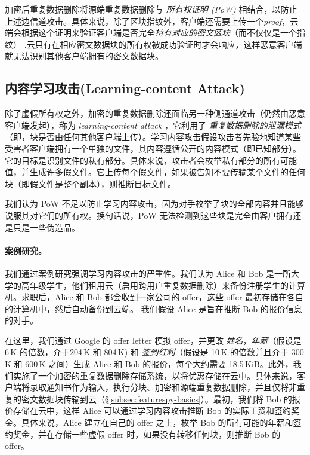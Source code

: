 加密后重复数据删除将源端重复数据删除与 {\em 所有权证明 (PoW)} \cite{halevi11} 相结合，以防止上述边信道攻击。具体来说，除了区块指纹外，客户端还需要上传一个{\em proof}，云端会根据这个证明来验证客户端是否完全{\em 持有对应的密文区块}（而不仅仅是一个指纹） .云只有在相应密文数据块的所有权被成功验证时才会响应，这样恶意客户端就无法识别其他客户端拥有的密文数据块。

\subsection{内容学习攻击(Learning-content Attack)}
\label{subsec:featurespy-attack}
除了虚假所有权之外，加密的重复数据删除还面临另一种侧通道攻击（仍然由恶意客户端发起），称为 {\em learning-content attack} \cite{harnik10, zuo2018mitigating}，它利用了 {\em 重复数据删除的泄漏模式}（即，块是否由任何其他客户端上传）。学习内容攻击假设攻击者先验地知道某些受害者客户端拥有一个单独的文件，其内容遵循公开的内容模式（即已知部分）。它的目标是识别文件的私有部分。具体来说，攻击者会枚举私有部分的所有可能值，并生成许多假文件。它上传每个假文件，如果被告知不要传输某个文件的任何块（即假文件是整个副本），则推断目标文件。

我们认为 PoW \cite{halevi11} 不足以防止学习内容攻击，因为对手枚举了块的全部内容并且能够说服其对它们的所有权。换句话说，PoW 无法检测到这些块是完全由客户拥有还是只是一些伪造品。

\paragraph*{案例研究。}
我们通过案例研究强调学习内容攻击的严重性。我们认为 Alice 和 Bob 是一所大学的高年级学生，他们租用云（启用跨用户重复数据删除）来备份注册学生的计算机。求职后，Alice 和 Bob 都会收到一家公司的 offer，这些 offer 最初存储在各自的计算机中，然后自动备份到云端。
我们假设 Alice 是旨在推断 Bob 的报价信息的对手。


在这里，我们通过 Google 的 offer letter \cite{GoogleOffer} 模拟 offer，并更改 \textit{姓名}，\textit{年薪}（假设是 6\,K \cite{harnik10} 的倍数，介于204\,K 和 804\,K) 和 \textit{签到红利}（假设是 10\,K 的倍数并且介于 300\,K 和 600\,K 之间）生成 Alice 和 Bob 的报价，每个大约需要 18.5\,KiB。此外，我们实施了一个加密的重复数据删除存储系统，以将优惠存储在云中。具体来说，客户端将录取通知书作为输入，执行分块、加密和源端重复数据删除，并且仅将非重复的密文数据块传输到云（\S\ref{subsec:featurespy-basics}）。最初，我们将 Bob 的报价存储在云中，这样 Alice 可以通过学习内容攻击推断 Bob 的实际工资和签约奖金。具体来说，Alice 建立在自己的 offer 之上，枚举 Bob 的所有可能的年薪和签约奖金，并在存储一些虚假 offer 时，如果没有转移任何块，则推断 Bob 的 offer。


